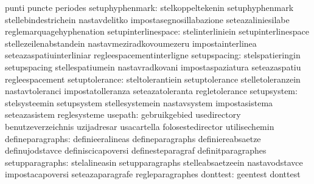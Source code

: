                                   punti                            puncte
                                  periodes
                 setuphyphenmark: stelkoppeltekenin                setuphyphenmark
                                  stellebindestrichein             nastavdelitko
                                  impostasegnosillabazione         seteazaliniesilabe
                                  reglemarquagehyphenation
             setupinterlinespace: stelinterliniein                 setupinterlinespace
                                  stellezeilenabstandein           nastavmeziradkovoumezeru
                                  impostainterlinea                seteazaspatiuinterliniar
                                  regleespacementinterligne
                    setupspacing: stelspatieringin                 setupspacing
                                  stellespatiumein                 nastavradkovani
                                  impostaspaziatura                seteazaspatiu
                                  regleespacement
                  setuptolerance: steltolerantiein                 setuptolerance
                                  stelletoleranzein                nastavtoleranci
                                  impostatolleranza                seteazatoleranta
                                  regletolerance
                     setupsystem: stelsysteemin                    setupsystem
                                  stellesystemein                  nastavsystem
                                  impostasistema                   seteazasistem
                                  reglesysteme
                         usepath: gebruikgebied                    usedirectory
                                  benutzeverzeichnis               uzijadresar %
                                  usacartella                      folosestedirector
                                  utilisechemin
                defineparagraphs: definieeralineas                 defineparagraphs
                                  definiereabsaetze                definujodstavce
                                  definiscicapoversi               definesteparagraf
                                  definitparagraphes
                 setupparagraphs: stelalineasin                    setupparagraphs
                                  stelleabsaetzeein                nastavodstavce
                                  impostacapoversi                 seteazaparagrafe
                                  regleparagraphes
                        donttest: geentest                         donttest
